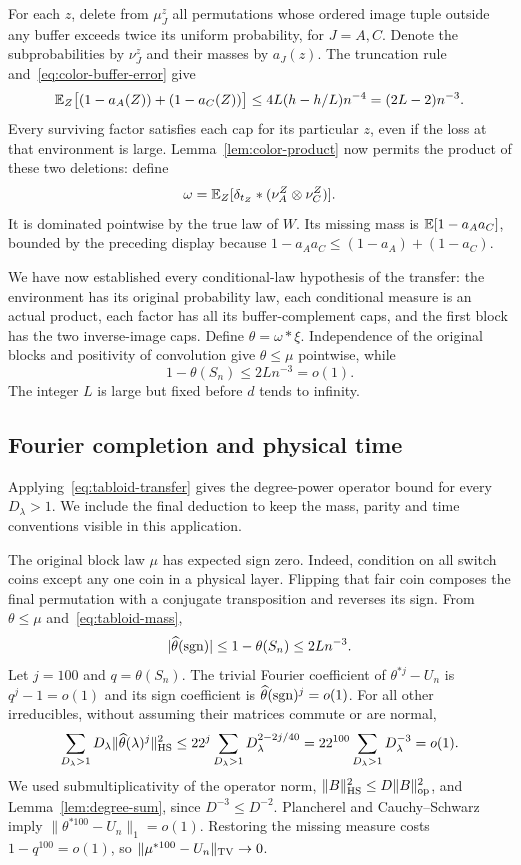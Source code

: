 For each $z$, delete from $\mu_J^z$ all permutations whose ordered image tuple outside any buffer exceeds twice its uniform probability, for $J=A,C$. Denote the subprobabilities by $\nu_J^z$ and their masses by $a_J(z)$. The truncation rule and~\eqref{eq:color-buffer-error} give
\[
 \mathbb E_Z\big[(1-a_A(Z))+(1-a_C(Z))\big]
 \le4L(h-h/L)n^{-4}=(2L-2)n^{-3}.
\]
Every surviving factor satisfies each cap for its particular $z$, even if the loss at that environment is large. Lemma~\ref{lem:color-product} now permits the product of these two deletions: define
\[
 \omega=\mathbb E_Z[\delta_{t_Z}*(\nu_A^Z\otimes\nu_C^Z)].
\]
It is dominated pointwise by the true law of $W$. Its missing mass is
$\mathbb E[1-a_Aa_C]$, bounded by the preceding display because
$1-a_Aa_C\le(1-a_A)+(1-a_C)$.

We have now established every conditional-law hypothesis of the transfer: the environment has its original probability law, each conditional measure is an actual product, each factor has all its buffer-complement caps, and the first block has the two inverse-image caps. Define $\theta=\omega*\xi$. Independence of the original blocks and positivity of convolution give $\theta\le\mu$ pointwise, while
\begin{equation}\label{eq:tabloid-mass}
 1-\theta(S_n)\le2L n^{-3}=o(1).
\end{equation}
The integer $L$ is large but fixed before $d$ tends to infinity.

\subsection{Fourier completion and physical time}

Applying~\eqref{eq:tabloid-transfer} gives the degree-power operator bound for every $D_\lambda>1$. We include the final deduction to keep the mass, parity and time conventions visible in this application.

The original block law $\mu$ has expected sign zero. Indeed, condition on all switch coins except any one coin in a physical layer. Flipping that fair coin composes the final permutation with a conjugate transposition and reverses its sign. From $\theta\le\mu$ and~\eqref{eq:tabloid-mass},
\[
 |\widehat\theta(\operatorname{sgn})|\le1-\theta(S_n)\le2L n^{-3}.
\]
Let $j=100$ and $q=\theta(S_n)$. The trivial Fourier coefficient of
$\theta^{*j}-U_n$ is $q^j-1=o(1)$ and its sign coefficient is
$\widehat\theta(\operatorname{sgn})^j=o(1)$. For all other irreducibles, without assuming their matrices commute or are normal,
\[
 \sum_{D_\lambda>1}D_\lambda
       \|\widehat\theta(\lambda)^j\|_{\mathrm{HS}}^2
 \le22^j\sum_{D_\lambda>1}D_\lambda^{2-2j/40}
 =22^{100}\sum_{D_\lambda>1}D_\lambda^{-3}=o(1).
\]
We used submultiplicativity of the operator norm,
$\|B\|_{\mathrm{HS}}^2\le D\|B\|_{\mathrm{op}}^2$, and Lemma~\ref{lem:degree-sum}, since $D^{-3}\le D^{-2}$.
Plancherel and Cauchy--Schwarz imply
$\|\theta^{*100}-U_n\|_1=o(1)$. Restoring the missing measure costs
$1-q^{100}=o(1)$, so $\|\mu^{*100}-U_n\|_{\mathrm{TV}}\to0$.

